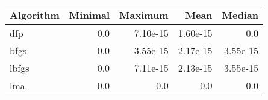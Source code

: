 \begin{tabular}{lrrrr}
\toprule
Algorithm &  Minimal &      Maximum &         Mean &       Median \\
\midrule
      dfp &      0.0 & 7.10e-15 & 1.60e-15 & 0.0 \\
     bfgs &      0.0 & 3.55e-15 & 2.17e-15 & 3.55e-15 \\
    lbfgs &      0.0 & 7.11e-15 & 2.13e-15 & 3.55e-15 \\
      lma &      0.0 & 0.0 & 0.0 & 0.0 \\
\bottomrule
\end{tabular}
